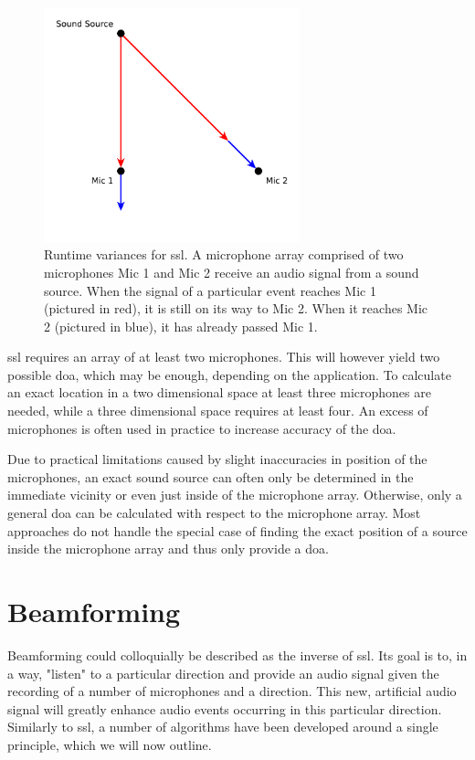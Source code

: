 \begin{figure}[]
	\centering
	\includegraphics[width=0.66\textwidth]{diagrams/basics_ssl.pdf}
	\caption{Runtime variances for \gls{ssl}.
		A microphone array comprised of two microphones Mic 1 and Mic 2 receive an audio signal from a sound source.
		When the signal of a particular event reaches Mic 1 (pictured in red), it is still on its way to Mic 2.
		When it reaches Mic 2 (pictured in blue), it has already passed Mic 1.}
	\label{pic:basics:ssl}
\end{figure}

\gls{ssl} requires an array of at least two microphones.
This will however yield two possible \gls{doa}, which may be enough, depending on the application.%
To calculate an exact location in a two dimensional space at least three microphones are needed, while a three dimensional space requires at least four.
An excess of microphones is often used in practice to increase accuracy of the \gls{doa}.

Due to practical limitations caused by slight inaccuracies in position of the microphones, an exact sound source can often only be determined in the immediate vicinity or even just inside of the microphone array.
Otherwise, only a general \gls{doa} can be calculated with respect to the microphone array.
Most approaches do not handle the special case of finding the exact position of a source inside the microphone array and thus only provide a \gls{doa}.


\section{Beamforming}
Beamforming could colloquially be described as the inverse of \gls{ssl}.
Its goal is to, in a way, "listen" to a particular direction and provide an audio signal given the recording of a number of microphones and a direction.
This new, artificial audio signal will greatly enhance audio events occurring in this particular direction.
Similarly to \gls{ssl}, a number of algorithms have been developed around a single principle, which we will now outline.

